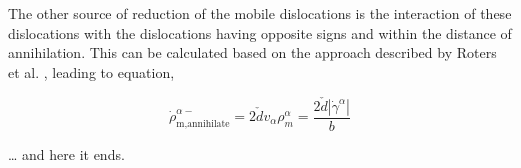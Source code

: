 \documentclass[a4paper,11pt]{article}
\begin{document}
The other source of reduction of the mobile dislocations is the interaction of these dislocations with the dislocations having opposite signs and within the distance of annihilation. 
This can be calculated based on the approach described by Roters et al. \cite{Roters2000}, leading to equation,

\begin{equation}
\dot\rho_{\text{m,annihilate}}^{\alpha-} = 2\check{d} v_\alpha \rho_m^\alpha = \frac{2\check{d}\left|\dot\gamma^\alpha\right|}{b} \label{eq:9}
\end{equation}


\ldots{} and here it ends.


\end{document}
